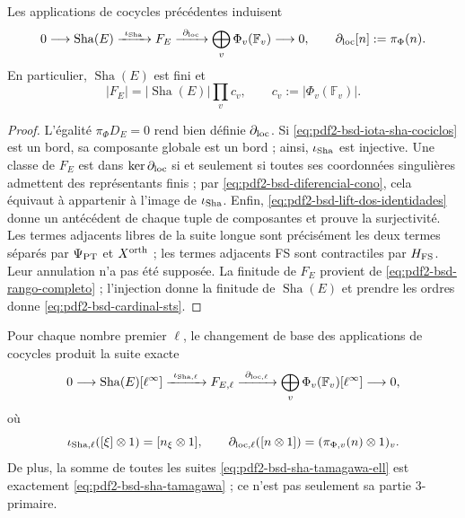 \begin{theorem}
\label{thm:pdf2-bsd-sha-tamagawa}
Les applications de cocycles précédentes induisent
\begin{equation}\label{eq:pdf2-bsd-sha-tamagawa}
 0\longrightarrow\operatorname{Sha}(E)
 \xrightarrow{\ \iota_{\rm Sha}\ }F_E
 \xrightarrow{\ \partial_{\rm loc}\ }
 \bigoplus_v\Phi_v(\mathbb F_v)
 \longrightarrow0,
 \qquad
 \partial_{\rm loc}[n]:=\pi_\Phi(n).
\end{equation}
En particulier, $\operatorname{Sha}(E)$ est fini et
\begin{equation}\label{eq:pdf2-bsd-cardinal-sts}
 |F_E|=|\operatorname{Sha}(E)|\prod_vc_v,
 \qquad c_v:=|\Phi_v(\mathbb F_v)|.
\end{equation}
\end{theorem}

\begin{proof}
L'égalité $\pi_\Phi D_E=0$ rend bien définie
$\partial_{\rm loc}$. Si \eqref{eq:pdf2-bsd-iota-sha-cociclos} est un
bord, sa composante globale est un bord ; ainsi, $\iota_{\rm Sha}$ est
injective. Une classe de $F_E$ est dans $\ker\partial_{\rm loc}$ si et seulement
si toutes ses coordonnées singulières admettent des représentants finis ; par
\eqref{eq:pdf2-bsd-diferencial-cono}, cela équivaut à appartenir à l'image de
$\iota_{\rm Sha}$. Enfin,
\eqref{eq:pdf2-bsd-lift-dos-identidades} donne un antécédent de chaque tuple de
composantes et prouve la surjectivité. Les termes adjacents libres de
la suite longue sont précisément les deux termes séparés par
$\Psi_{\rm PT}$ et $X^{\rm orth}$ ; les termes adjacents FS sont
contractiles par $H_{\rm FS}$. Leur annulation n'a pas été supposée. La finitude
de $F_E$ provient de \eqref{eq:pdf2-bsd-rango-completo} ; l'injection donne la
 finitude de $\operatorname{Sha}(E)$ et prendre les ordres donne
 \eqref{eq:pdf2-bsd-cardinal-sts}.
\end{proof}

\begin{corollary}
\label{cor:pdf2-bsd-sha-tamagawa-todos-ell}
Pour chaque nombre premier $\ell$, le changement de base des applications de cocycles produit
la suite exacte
\begin{equation}\label{eq:pdf2-bsd-sha-tamagawa-ell}
 0\longrightarrow\operatorname{Sha}(E)[\ell^\infty]
 \xrightarrow{\ \iota_{{\rm Sha},\ell}\ }F_{E,\ell}
 \xrightarrow{\ \partial_{{\rm loc},\ell}\ }
 \bigoplus_v\Phi_v(\mathbb F_v)[\ell^\infty]
 \longrightarrow0,
\end{equation}
où
\begin{equation}\label{eq:pdf2-bsd-mapas-ell-generadores}
 \iota_{{\rm Sha},\ell}([\xi]\otimes1)
   =[n_\xi\otimes1],
 \qquad
 \partial_{{\rm loc},\ell}([n\otimes1])
   =(\pi_{\Phi,v}(n)\otimes1)_v.
\end{equation}
De plus, la somme de toutes les suites
\eqref{eq:pdf2-bsd-sha-tamagawa-ell} est exactement
\eqref{eq:pdf2-bsd-sha-tamagawa} ; ce n'est pas seulement sa partie $3$-primaire.
\end{corollary}

